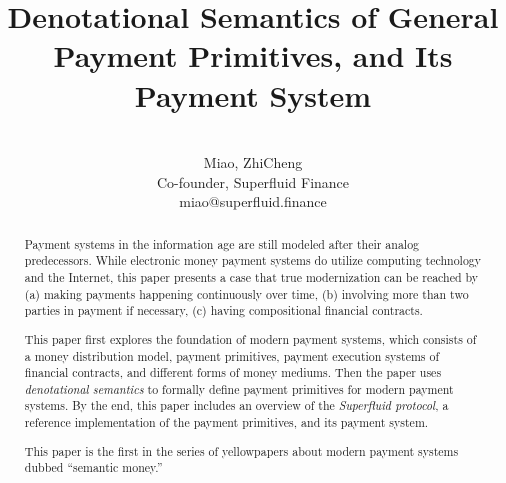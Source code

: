 




\title{Denotational Semantics of General Payment Primitives, and Its Payment System}

\author{\\
    Miao, ZhiCheng\\
    Co-founder, Superfluid Finance\\
    miao@superfluid.finance
}


\maketitle

\begin{abstract}
Payment systems in the information age are still modeled after their analog predecessors. While
electronic money payment systems do utilize computing technology and the Internet, this paper
presents a case that true modernization can be reached by (a) making payments happening continuously
over time, (b) involving more than two parties in payment if necessary, (c) having compositional
financial contracts.

This paper first explores the foundation of modern payment systems, which consists of a money
distribution model, payment primitives, payment execution systems of financial contracts, and
different forms of money mediums. Then the paper uses \textit{denotational semantics} to formally
define payment primitives for modern payment systems. By the end, this paper includes an overview of
the \textit{Superfluid protocol}, a reference implementation of the payment primitives, and its
payment system.

This paper is the first in the series of yellowpapers about modern payment systems dubbed ``semantic
money.''

\end{abstract}

\begin{versionhistory}
\end{versionhistory}

